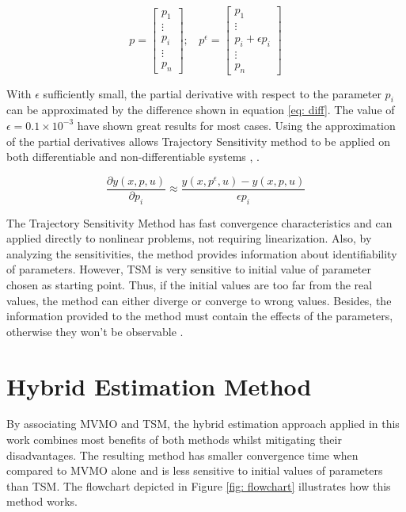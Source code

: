 \begin{equation}
	p = 
	\begin{bmatrix}
		p_{1} \\
		\vdots \\
		p_{i} \\
		\vdots \\
		p_{n}
	\end{bmatrix}; \ \ \ \ 
	 p^{\epsilon} =
	\begin{bmatrix}
		p_{1} \\
		\vdots \\
		p_{i} + \epsilon p_{i} \\
		\vdots \\
		p_{n}
	\end{bmatrix}
	\label{eq: pvecs}
\end{equation}

With $\epsilon$ sufficiently small, the partial derivative with respect to the parameter $p_{i}$ can be approximated by the difference shown in equation \eqref{eq: diff}. The value of $\epsilon = 0.1 \times 10^{-3}$ have shown great results for most cases. Using the approximation of the partial derivatives allows Trajectory Sensitivity method to be applied on both differentiable and non-differentiable systems \cite{Benchluch1993}, \cite{Cari2006}.

\begin{equation}
	\frac{\partial y(x, p, u)}{\partial p_{i}} \approx \frac{y(x, p^{\epsilon}, u) - y(x, p, u)}{\epsilon p_{i}}
	\label{eq: diff}
\end{equation}

The Trajectory Sensitivity Method has fast convergence characteristics and can applied directly to nonlinear problems, not requiring linearization. Also, by analyzing the sensitivities, the method provides information about identifiability of parameters. However, TSM is very sensitive to initial value of parameter chosen as starting point. Thus, if the initial values are too far from the real values, the method can either diverge or converge to wrong values. Besides, the information provided to the method must contain the effects of the parameters, otherwise they won't be observable \cite{Benchluch1993}.

\section{Hybrid Estimation Method}
\label{sec: Hybrid_Method}

By associating MVMO and TSM, the hybrid estimation approach applied in this work combines most benefits of both methods whilst mitigating their disadvantages. The resulting method has smaller convergence time when compared to MVMO alone and is less sensitive to initial values of parameters than TSM. The flowchart depicted in Figure \ref{fig: flowchart} illustrates how this method works.

